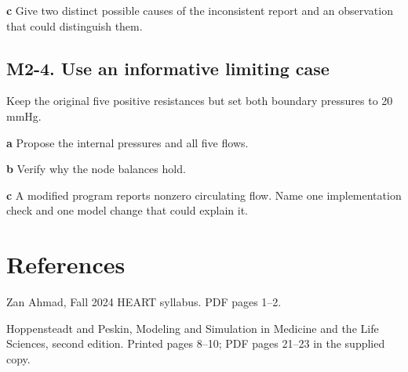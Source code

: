 \documentclass[11pt,letterpaper]{article}
\theoremstyle{definition}\newtheorem{definition}{Definition}\newtheorem{example}{Example}
\numberwithin{equation}{section}
\begin{document}
\textbf{c} Give two distinct possible causes of the inconsistent report and an observation that could distinguish them.

\par\noindent\begin{minipage}{\linewidth}
\subsection*{M2-4. Use an informative limiting case}
Keep the original five positive resistances but set both boundary pressures to 20 mmHg.

\textbf{a} Propose the internal pressures and all five flows.

\end{minipage}\par\medskip
\textbf{b} Verify why the node balances hold.

\textbf{c} A modified program reports nonzero circulating flow. Name one implementation check and one model change that could explain it.

\section*{References}
\noindent\begin{minipage}{\linewidth}
Zan Ahmad, Fall 2024 HEART syllabus. PDF pages 1--2.

\end{minipage}\par\medskip
\noindent\begin{minipage}{\linewidth}
Hoppensteadt and Peskin, Modeling and Simulation in Medicine and the Life Sciences, second edition. Printed pages 8--10; PDF pages 21--23 in the supplied copy.

\end{minipage}\par\medskip
\end{document}
